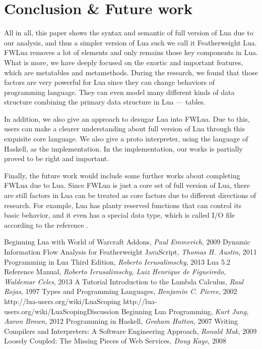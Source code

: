 \documentclass{article}
\begin{document}
\section{Conclusion \& Future work}
All in all, this paper shows the syntax and semantic of full version of Lua due to our analysis, and thus a simpler version of Lua such we call it Featherweight Lua. FWLua removes a lot of elements and only remains those key components in Lua. What is more, we have deeply focused on the exortic and important features, which are metatables and metamethods. During the research, we found that those factors are very powerful for Lua since they can change behaviors of programming language. They can even model many different kinds of data structure combining the primary data structure in Lua --- tables.

In addition, we also give an approach to desugar Lua into FWLua. Due to this, users can make a clearer understanding about full version of Lua through this exquisite core language. We also give a proto interpreter, using the language of Haskell, as the implementation. In the implementation, our works is partially proved to be right and important.

Finally, the future work would include some further works about completing FWLua due to Lua. Since FWLua is just a core set of full version of Lua, there are still factors in Lua can be treated as core factors due to different directions of research. For example, Lua has planty reserved functions that can control its basic behavior, and it even has a special data type, which is called I/O file according to the reference \cite{PIL}.

\begin{thebibliography}{10}

 Beginning Lua with World of Warcraft Addons, {\it Paul Emmerich}, 2009
 Dynamic Information Flow Analysis for Featherweight JavaScript, {\it Thomas H. Austin}, 2011
 Programming in Lua Third Edition, {\it  Roberto Ierusalimschy}, 2013
 Lua 5.2 Reference Manual, {\it Roberto Ierusalimschy, Luiz Henrique de Figueiredo, Waldemar Celes}, 2013
 A Tutorial Introduction to the Lambda Calculus, {\it Raul Rojas}, 1997
 Types and Programming Languages, {\it Benjamin C. Pierce}, 2002
 http://lua-users.org/wiki/LuaScoping
 http://lua-users.org/wiki/LuaScopingDiscussion
 Beginning Lua Programming, {\it Kurt Jung, Aaron Brown}, 2012
 Programming in Haskell, {\it Graham Hutton}, 2007
 Writing Compilers and Interpreters: A Software Engineering Approach, {\it Ronald Mak}, 2009
 Loosely Coupled: The Missing Pieces of Web Services, {\it Doug Kaye}, 2008

\end{thebibliography}
\end{document}
